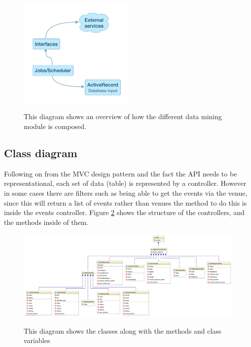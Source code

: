 			\begin{figure}[ht] %
				\caption[Overview of the data mining aspect]{This diagram shows an overview of how the different data mining module is composed.}
				\centering
				\includegraphics[width=0.5\textwidth]{Images/mining-overview}
				\label{fig:mining}
			\end{figure}

		\subsection{Class diagram}
			Following on from the MVC design pattern and the fact the API needs to be representational, each set of data (table) is represented by a controller. However in some cases there are filters such as being able to get the events via the venue, since this will return a list of events rather than venues the method to do this is inside the events controller. Figure \ref{fig:controllers} shows the structure of the controllers, and the methods inside of them. 

			\begin{figure}[ht] %
				\caption[Controllers Class Diagram]{This diagram shows the classes along with the methods and class variables}
				\centering
				\includegraphics[width=1\textwidth,angle=90]{Images/controllers_crop}
				\label{fig:controllers}
			\end{figure}


